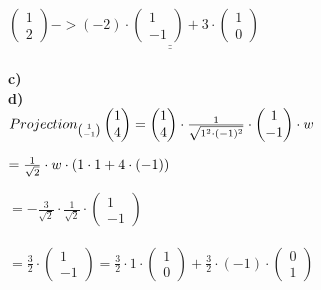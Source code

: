 \documentclass[11pt]{amsart}
\begin{document}
$\begin{pmatrix} 1 \\ 2 \end{pmatrix} -> 
 \underline{\underline{(-2) \cdot \begin{pmatrix} 1 \\ -1 \end{pmatrix} + 3 \cdot \begin{pmatrix} 1 \\ 0 \end{pmatrix}}}$ \\\\
 
 \textbf{c)}\\
 
 
 
 
 
 \textbf{d)}\\

$Projection_{\binom{1}{-1}} \begin{pmatrix} 1 \\ 4 \end{pmatrix} = \begin{pmatrix} 1 \\ 4 \end{pmatrix} \cdot \frac{1}{\sqrt{1^2\cdot(-1)^2}} \cdot \begin{pmatrix} 1 \\ -1 \end{pmatrix} 
 \cdot w \\\\$  
 
$  = \frac{1}{\sqrt{2}} \cdot w \cdot (1\cdot1+4\cdot(-1)) \\\\$ 

$= -\frac{3}{\sqrt{2}} \cdot \frac{1}{\sqrt{2}} \cdot \begin{pmatrix} 1 \\ -1 \end{pmatrix} $ \\\\

$ = \frac{3}{2} \cdot \begin{pmatrix} 1 \\ -1 \end{pmatrix} = \frac{3}{2} \cdot 1 \cdot 
	\begin{pmatrix} 1 \\ 0 \end{pmatrix} + \frac{3}{2} \cdot (-1) \cdot 
	\begin{pmatrix} 0 \\ 1 \end{pmatrix} $
 
 
\end{document}
